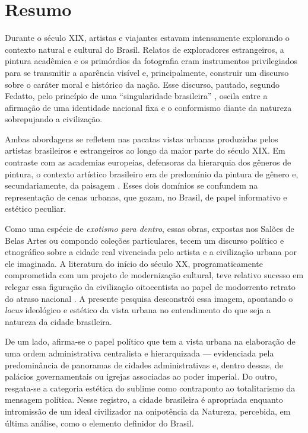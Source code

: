 \hypertarget{resumo}{%
\section{Resumo}\label{resumo}}

Durante o século XIX, artistas e viajantes estavam intensamente
explorando o contexto natural e cultural do Brasil. Relatos de
exploradores estrangeiros, a pintura acadêmica e os primórdios da
fotografia eram instrumentos privilegiados para se transmitir a
aparência visível e, principalmente, construir um discurso sobre o
caráter moral e histórico da nação. Esse discurso, pautado, segundo
Fedatto, pelo princípio de uma ``singularidade brasileira''
\cite{Fedatto_2013}, oscila entre a afirmação de uma identidade nacional
fixa e o conformismo diante da natureza sobrepujando a civilização.

Ambas abordagens se refletem nas pacatas vistas urbanas produzidas pelos
artistas brasileiros e estrangeiros ao longo da maior parte do século
XIX. Em contraste com as academias europeias, defensoras da hierarquia
dos gêneros de pintura, o contexto artístico brasileiro era de
predomínio da pintura de gênero e, secundariamente, da paisagem
\cite{Squeff_2012}. Esses dois domínios se confundem na representação de
cenas urbanas, que gozam, no Brasil, de papel informativo e estético
peculiar.

Como uma espécie de \emph{exotismo para dentro}, essas obras, expostas
nos Salões de Belas Artes ou compondo coleções particulares, tecem um
discurso político e etnográfico sobre a cidade real vivenciada pelo
artista e a civilização urbana por ele imaginada. A literatura do início
do século XX, programaticamente comprometida com um projeto de
modernização cultural, teve relativo sucesso em relegar essa figuração
da civilização oitocentista ao papel de modorrento retrato do atraso
nacional \cite{Bernd_1992}. A presente pesquisa desconstrói essa imagem,
apontando o \emph{locus} ideológico e estético da vista urbana no
entendimento do que seja a natureza da cidade brasileira.

De um lado, afirma-se o papel político que tem a vista urbana na
elaboração de uma ordem administrativa centralista e hierarquizada ---
evidenciada pela predominância de panoramas de cidades administrativas
e, dentro dessas, de palácios governamentais ou igrejas associadas ao
poder imperial. Do outro, resgata-se a categoria estética do sublime
\cite{Naxara_2004} como contraponto ao totalitarismo da mensagem
política. Nesse registro, a cidade brasileira é apropriada enquanto
intromissão de um ideal civilizador na onipotência da Natureza,
percebida, em última análise, como o elemento definidor do Brasil.

